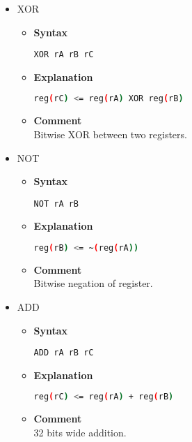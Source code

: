 \begin{itemize}
    \item XOR
    \begin{itemize}
        \item \textbf{Syntax}
        \begin{lstlisting}[language={[markII]Assembler}, frame=single]
    XOR rA rB rC
        \end{lstlisting}
        \item \textbf{Explanation}
        \begin{lstlisting}[language=bash, frame=single]
    reg(rC) <= reg(rA) XOR reg(rB)
        \end{lstlisting}
        \item \textbf{Comment} \\
    Bitwise XOR between two registers.
    \end{itemize}

    \item NOT
    \begin{itemize}
        \item \textbf{Syntax}
        \begin{lstlisting}[language={[markII]Assembler}, frame=single]
    NOT rA rB
        \end{lstlisting}
        \item \textbf{Explanation}
        \begin{lstlisting}[language=bash, frame=single]
    reg(rB) <= ~(reg(rA))
        \end{lstlisting}
        \item \textbf{Comment} \\
    Bitwise negation of register.
    \end{itemize}

    \item ADD
    \begin{itemize}
        \item \textbf{Syntax}
        \begin{lstlisting}[language={[markII]Assembler}, frame=single]
    ADD rA rB rC
        \end{lstlisting}
        \item \textbf{Explanation}
        \begin{lstlisting}[language=bash, frame=single]
    reg(rC) <= reg(rA) + reg(rB)
        \end{lstlisting}
        \item \textbf{Comment} \\
    32 bits wide addition.
    \end{itemize}


\end{itemize}
